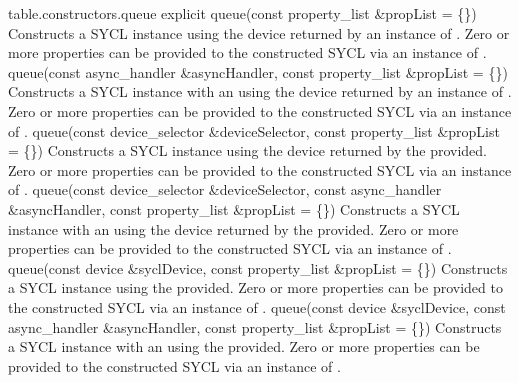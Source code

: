   {table.constructors.queue}
  \addRow
    { explicit queue(const property_list \&propList = \{\}) }
    {
      Constructs a SYCL  instance using the device returned by
      an instance of . Zero or more properties can
      be provided to the constructed SYCL  via an instance of
      .
    }
  \addRowTwoL
    { queue(const async_handler \&asyncHandler, }
    { const property_list \&propList = \{\}) }
    {
      Constructs a SYCL  instance with an  using the device returned by an instance of . Zero or more properties can be provided to the
      constructed SYCL  via an instance of .
    }
  \addRowTwoL
    { queue(const device_selector \&deviceSelector, }
    { const property_list \&propList = \{\}) }
    {
      Constructs a SYCL  instance using the device returned by
      the  provided. Zero or more properties can be
      provided to the constructed SYCL  via an instance of
      .
    }
  \addRowThreeL
    { queue(const device_selector \&deviceSelector, }
    { const async_handler \&asyncHandler, }
    { const property_list \&propList = \{\}) }
    {
      Constructs a SYCL  instance with an  using the device returned by the  provided. Zero or more properties can be provided to the constructed
      SYCL  via an instance of .
    }
  \addRowTwoL
    { queue(const device \&syclDevice, }
    { const property_list \&propList = \{\}) }
    {
      Constructs a SYCL  instance using the  provided. Zero or more properties can be provided to the
      constructed SYCL  via an instance of .
    }
  \addRowThreeL
    { queue(const device \&syclDevice, }
    { const async_handler \&asyncHandler, }
    { const property_list \&propList = \{\}) }
    {
      Constructs a SYCL  instance with an  using the  provided. Zero or more
      properties can be provided to the constructed SYCL 
      via an instance of .
    }
